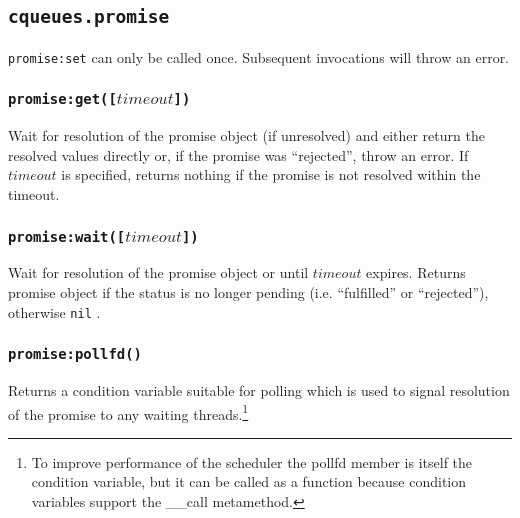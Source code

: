 \documentclass[11pt, oneside]{memoir}
\newcommand{\fn}[1]{\texttt{#1} }
\newcommand{\nil}[0]{\texttt{nil} }
\newcounter{toccols}
\newenvironment{Module}[1]{
	\subsection{\texttt{#1}}
	\addtocontents{toc}{
		\protect\begin{multicols}{\value{toccols}}
	}
}{
	\addtocontents{toc}{\protect\end{multicols}}
}
\begin{document}
\begin{Module}{cqueues.promise}
\fn{promise:set} can only be called once. Subsequent invocations will throw an error.

\subsubsection[\fn{promise:get}]{\fn{promise:get([$timeout$])}}

Wait for resolution of the promise object (if unresolved) and either return the resolved values directly or, if the promise was ``rejected'', throw an error. If $timeout$ is specified, returns nothing if the promise is not resolved within the timeout.

\subsubsection[\fn{promise:wait}]{\fn{promise:wait([$timeout$])}}

Wait for resolution of the promise object or until $timeout$ expires. Returns promise object if the status is no longer pending (i.e. ``fulfilled'' or ``rejected''), otherwise \nil.

\subsubsection[\fn{promise:pollfd}]{\fn{promise:pollfd()}}

Returns a condition variable suitable for polling which is used to signal resolution of the promise to any waiting threads.\footnote{To improve performance of the scheduler the pollfd member is itself the condition variable, but it can be called as a function because condition variables support the \_\_call metamethod.}

\end{Module}
\end{document}
